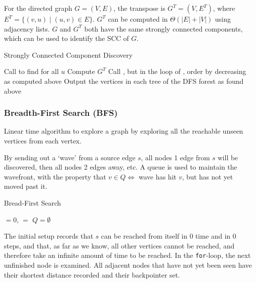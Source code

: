 \documentclass[10pt]{article}
\begin{document}
For the directed graph $G=(V,E)$, the transpose is $G^T=(V,E^T)$, where $E^T=\{(v,u)\mid(u,v)\in E\}$.  $G^T$ can be computed in $\Theta(|E|+|V|)$ using adjacency lists.  $G$ and $G^T$ both have the same strongly connected components, which can be used to identify the SCC of $G$.
\begin{algorithm}
	\caption{Strongly Connected Component Discovery}
	Call  to find  for all $u$\;
	Compute $G^T$\;
	Call , but in the loop of \DFS, order by decreasing  as computed above\;
	Output the vertices in each tree of the DFS forest as found above\;
\end{algorithm}
\subsubsection{Breadth-First Search (BFS)}
Linear time algorithm to explore a graph by exploring all the reachable unseen vertices from each vertex.

By sending out a `wave' from a source edge $s$, all nodes 1 edge from $s$ will be discovered, then all nodes 2 edges away, etc.  A queue is used to maintain the wavefront, with the property that $v\in Q\Leftrightarrow$ wave has hit $v$, but has not yet moved past it.
\begin{algorithm}
	\caption{Bread-First Search}
	
	$=0$, $=$\null\;
	$Q=\emptyset$\;
	\;
\end{algorithm}
The initial setup records that $s$ can be reached from itself in 0 time and in 0 steps, and that, as far as we know, all other vertices cannot be reached, and therefore take an infinite amount of time to be reached.  In the \texttt{for}-loop, the next unfinished node is examined.  All adjacent nodes that have not yet been seen have their shortest distance recorded and their backpointer set.
\end{document}
